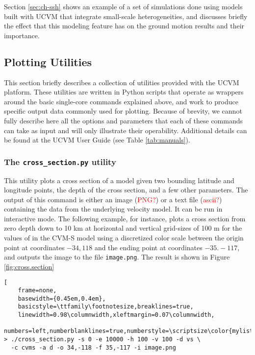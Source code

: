 Section \ref{sec:ch-ssh} shows an example of a set of simulations done using models built with UCVM that integrate small-scale heterogeneities, and discusses briefly the effect that this modeling feature has on the ground motion results and their importance.

\subsection{Plotting Utilities}

This section briefly describes a collection of utilities provided with the UCVM platform. These utilities are written in Python scripts that operate as wrappers around the basic single-core commands explained above, and work to produce specific output data commonly used for plotting. Because of brevity, we cannot fully describe here all the options and parameters that each of these commands can take as input and will only illustrate their operability. Additional details can be found at the UCVM User Guide (see Table \ref{tab:manuals}).

\subsubsection{The \textup{\texttt{cross\_section.py}} utility}

This utility plots a cross section of a model given two bounding latitude and longitude points, the depth of the cross section, and a few other parameters. The output of this command is either an image (\textcolor{red}{PNG?}) or a text file (\textcolor{red}{ascii?}) containing the data from the underlying velocity model. It can be run in interactive mode. The following example, for instance, plots a cross section from zero depth down to 10 km at horizontal and vertical grid-sizes of 100 m for the values of \vs{} in the CVM-S model using a discretized color scale between the origin point at coordinates $-34,118$ and the ending point at coordinates $-35.-117$, and outputs the image to the file \texttt{image.png}. The result is shown in Figure \ref{fig:cross.section}

\begin{lstlisting}[
	frame=none,
	basewidth={0.45em,0.4em},
	basicstyle=\ttfamily\footnotesize,breaklines=true,
	linewidth=0.98\columnwidth,xleftmargin=0.07\columnwidth,
	numbers=left,numberblanklines=true,numberstyle=\scriptsize\color{mylistingnclr}]
> ./cross_section.py -s 0 -e 10000 -h 100 -v 100 -d vs \
  -c cvms -a d -o 34,-118 -f 35,-117 -i image.png
\end{lstlisting}

